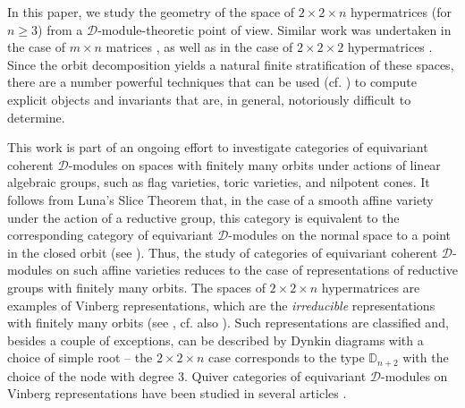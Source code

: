 \documentclass[11pt,reqno]{amsart}
\newcommand{\D}{\mathcal{D}}
\numberwithin{equation}{section}
\begin{document}
In this paper, we study the geometry of the space of $2\times 2\times n$ hypermatrices (for $n\geq 3$) from a $\D$-module-theoretic point of view. Similar work was undertaken in the case of $m\times n$ matrices \cite{raicuWeymanLocal, lorcla}, as well as in the case of $2\times 2 \times 2$ hypermatrices \cite{perlman2020equivariant}. Since the orbit decomposition yields a natural finite stratification of these spaces, there are a number powerful techniques that can be used (cf. \cite{lHorincz2019categories}) to compute explicit objects and invariants that are, in general, notoriously difficult to determine.

This work is part of an ongoing effort to investigate categories of equivariant coherent  $\D$-modules on spaces with finitely many orbits under actions of linear algebraic groups, such as flag varieties, toric varieties, and nilpotent cones. It follows from Luna's Slice Theorem \cite{luna} that, in the case of a smooth affine variety under the action of a reductive group, this category is equivalent to the corresponding category of equivariant $\D$-modules on the normal space to a point in the closed orbit (see \cite[Proposition 4.6]{lHorincz2019categories}). Thus, the study of categories of equivariant coherent $\D$-modules on such affine varieties reduces to the case of representations of reductive groups with finitely many orbits. The spaces of $2\times 2\times n$ hypermatrices are examples of Vinberg representations, which are the \textit{irreducible} representations with finitely many orbits (see \cite[Section 10.1]{landsberg2012tensors},  cf. also \cite{satokimura, kac}). Such representations are classified and, besides a couple of exceptions, can be described by Dynkin diagrams with a choice of simple root -- the $2\times 2\times n$ case corresponds to the type $\mathbb{D}_{n+2}$ with the choice of the node with degree $3$. Quiver categories of equivariant $\D$-modules on Vinberg representations have been studied in several articles \cite{binary, lHorincz2019categories, perlman2020equivariant,  senary, subexceptional}.

\medskip
\end{document}
